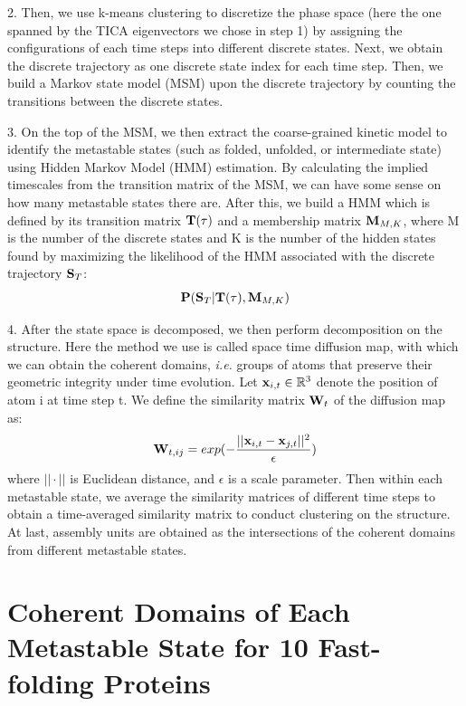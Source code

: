 \documentclass[12pt]{article}
\begin{document}
\hangindent=0.7cm
2. Then, we use k-means clustering to discretize the phase space (here the one spanned by the TICA eigenvectors we chose in step 1) by assigning the configurations of each time steps into different discrete states\cite{TICA_collective_variable,TICA_commute_map}. Next, we obtain the discrete trajectory as one discrete state index for each time step. Then, we build a Markov state model (MSM) upon the discrete trajectory by counting the transitions between the discrete states\cite{MSM}.

\hangindent=0.7cm
3. On the top of the MSM, we then extract the coarse-grained kinetic model to identify the metastable states (such as folded, unfolded, or intermediate state) using Hidden Markov Model (HMM) estimation. By calculating the implied timescales from the transition matrix of the MSM, we can have some sense on how many metastable states there are. After this, we build a HMM which is defined by its transition matrix ${\bf T}(\tau)$ and a membership matrix ${\bf M}_{M,K}$\cite{HMM}, where M is the number of the discrete states and K is the number of the hidden states found by maximizing the likelihood of the HMM associated with the discrete trajectory ${\bf S}_{T}$:
\begin{equation}
{\bf P}({\bf S}_{T}| {\bf T}(\tau),{\bf M}_{M,K})
\end{equation}

\hangindent=0.7cm
4. After the state space is decomposed, we then perform decomposition on the structure. Here the method we use is called space time diffusion map\cite{Lrenzo_S3D,diffusion_map,diffusion_map_clustering}, with which  we can obtain the coherent domains, {\it i.e.} groups of atoms that preserve their geometric integrity under time evolution. Let ${\bf x}_{i,t} \in {\mathbb R}^{3}$ denote the position of atom i at time step t. We define the similarity matrix ${\bf W}_{t}$ of the diffusion map as:
\begin{equation}
{\bf W}_{t,ij} = exp(- \frac{||{\bf x}_{i,t}-{\bf x}_{j,t}||^{2}}{\epsilon})
\end{equation}
where $||\cdot||$ is Euclidean distance, and $\epsilon$ is a scale parameter. Then within each metastable state, we average the similarity matrices of different time steps to obtain a time-averaged similarity matrix to conduct clustering on the structure. At last, assembly units are obtained as the intersections of the coherent domains from different metastable states.

\section*{Coherent Domains of Each Metastable State for 10 Fast-folding Proteins}
\end{document}
